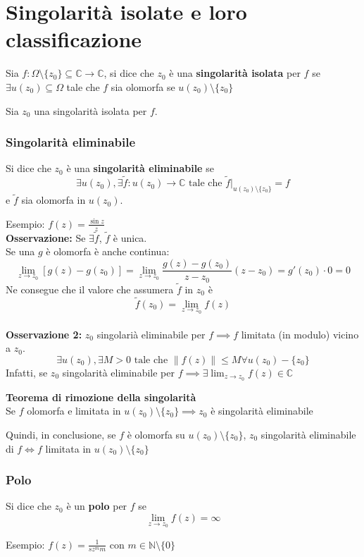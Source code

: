 \documentclass[a4paper]{article}
\newcommand{\N}{\mathbb{N}}
\newcommand{\C}{\mathbb{C}}
\begin{document}
\section{Singolarità isolate e loro classificazione}	
\begin{tcolorbox}
	Sia $f:\Omega \setminus \{z_0\} \subseteq\C\to \C$, si dice che $z_0$ è una \textbf{singolarità isolata} per $f$ se $\exists u(z_0)\subseteq\Omega$ tale che $f$ sia olomorfa se $u(z_0)\setminus \{z_0\}$  
\end{tcolorbox}
Sia $z_0$ una singolarità isolata per $f$.
\subsubsection{Singolarità eliminabile}
\begin{tcolorbox}
Si dice che $z_0$ è una \textbf{singolarità eliminabile} se 
\[\exists u(z_0),\exists\tilde f:u(z_0)\to \C \text{ tale che }\tilde f|_{u(z_0)\setminus \{z_0\} }=f\]
e $\tilde f$ sia olomorfa in $u(z_0)$.
\end{tcolorbox}
Esempio: $f(z)= \frac{\sin z}{z}$
\\\textbf{Osservazione:} Se $\exists \tilde f$, $\tilde f$ è unica.
\\Se una $g$ è olomorfa è anche continua:
\[\lim_{z \to z_0} [g(z)-g(z_0)]=\lim_{z \to z_0} \frac{g(z)-g(z_0)}{z-z_0}(z-z_0)=g'(z_0)\cdot 0=0\]
Ne consegue che il valore che assumera $\tilde f$ in $z_0$ è 
\[\tilde f(z_0)=\lim_{z \to z_0} f(z)\]\\
\textbf{Osservazione 2:} $z_0$ singolarià eliminabile per $f\implies f$ limitata (in modulo) vicino a $z_0$.
\[\exists u(z_0), \exists M>0 \text{ tale che } \|f(z)\|\le M\forall u(z_0)-\{z_0\} \]
Infatti, se $z_0$ singolarità eliminabile per $f\implies \exists \lim_{z \to z_0} f(z)\in\C$
\begin{tcolorbox}
	\textbf{Teorema di rimozione della singolarità} 
	\\Se $f$ olomorfa e limitata in $u(z_0)\setminus \{z_0\} \implies z_0$ è singolarità eliminabile
\end{tcolorbox}
Quindi, in conclusione, se $f$ è olomorfa su $u(z_0)\setminus \{z_0\} $, $z_0$ singolarità eliminabile di $f \iff f$ limitata in $u(z_0)\setminus \{z_0\} $ 
\subsubsection{Polo}
\begin{tcolorbox}
	Si dice che $z_0$ è un \textbf{polo} per $f$ se 
	\[\lim_{z \to z_0} f(z)=\infty\]
\end{tcolorbox}
Esempio: $f(z)=\frac{1}{sz^mm}$ con $m\in \N\setminus \{0\} $
\end{document}
